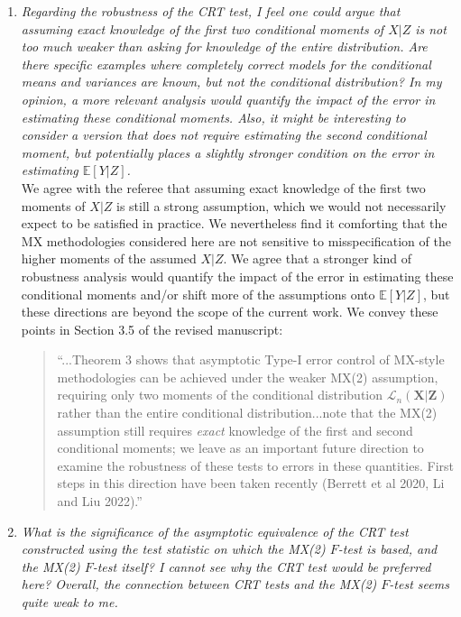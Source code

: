 \documentclass[12pt]{article}
\begin{document}
\begin{enumerate}
	
	
	\item \textsl{Regarding the robustness of the CRT test, I feel one could argue that assuming exact knowledge of the first two conditional moments of $X | Z$ is not too much weaker than asking for knowledge of the entire distribution. Are there specific examples where completely correct models for the conditional means and variances are known, but not the conditional distribution? In my opinion, a more relevant analysis would quantify the impact of the error in estimating these conditional moments. Also, it might be interesting to consider a version that does not require estimating the second conditional moment, but potentially places a slightly stronger condition on the error in estimating $\mathbb E[Y | Z]$.}\\
	
	We agree with the referee that assuming exact knowledge of the first two moments of $X|Z$ is still a strong assumption, which we would not necessarily expect to be satisfied in practice. We nevertheless find it comforting that the MX methodologies considered here are not sensitive to misspecification of the higher moments of the assumed $X|Z$. We agree that a stronger kind of robustness analysis would quantify the impact of the error in estimating these conditional moments and/or shift more of the assumptions onto $\mathbb E[Y|Z]$, but these directions are beyond the scope of the current work. We convey these points in Section 3.5 of the revised manuscript:
	\begin{quote}
	``...Theorem 3 shows that asymptotic Type-I error control of MX-style methodologies can be achieved under the weaker MX(2) assumption, requiring only two moments of the conditional distribution $\mathcal L_n(\bm X | \bm Z)$ rather than the entire conditional distribution...note that the MX(2) assumption still requires \textit{exact} knowledge of the first and second conditional moments; we leave as an important future direction to examine the robustness of these tests to errors in these quantities. First steps in this direction have been taken recently (Berrett et al 2020, Li and Liu 2022).''
	\end{quote}

	\item \textsl{What is the significance of the asymptotic equivalence of the CRT test constructed using the test statistic on which the MX(2) $F$-test is based, and the MX(2) $F$-test itself? I cannot see why the CRT test would be preferred here? Overall, the connection between CRT tests and the MX(2) $F$-test seems quite weak to me.} \\
	

\end{enumerate}
\end{document}
